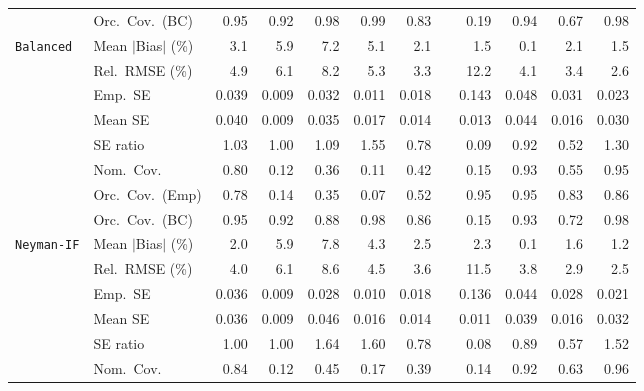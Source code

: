 \begin{landscape}
\begin{longtable}{llrrrrrrrrrr}
 & Orc.\ Cov.\ (BC) & \cellcolor{rankone}0.95 & 0.92 & 0.98 & 0.99 & 0.83 &  & 0.19 & \cellcolor{ranktwo}0.94 & 0.67 & \cellcolor{rankthree}0.98 \\
\addlinespace[2pt]
\quad \texttt{Balanced} & Mean $|$Bias$|$ (\%) & 3.1 & 5.9 & 7.2 & 5.1 & 2.1 &  & \cellcolor{rankthree}1.5 & \cellcolor{rankone}0.1 & 2.1 & \cellcolor{ranktwo}1.5 \\
 & Rel.\ RMSE (\%) & 4.9 & 6.1 & 8.2 & 5.3 & \cellcolor{ranktwo}3.3 &  & 12.2 & 4.1 & \cellcolor{rankthree}3.4 & \cellcolor{rankone}2.6 \\
 & Emp.\ SE & 0.039 & 0.009 & 0.032 & 0.011 & 0.018 &  & 0.143 & 0.048 & 0.031 & 0.023 \\
 & Mean SE & 0.040 & 0.009 & 0.035 & 0.017 & 0.014 &  & 0.013 & 0.044 & 0.016 & 0.030 \\
 & SE ratio & \cellcolor{ranktwo}1.03 & \cellcolor{rankone}1.00 & 1.09 & 1.55 & 0.78 &  & 0.09 & \cellcolor{rankthree}0.92 & 0.52 & 1.30 \\
 & Nom.\ Cov. & \cellcolor{rankthree}0.80 & 0.12 & 0.36 & 0.11 & 0.42 &  & 0.15 & \cellcolor{ranktwo}0.93 & 0.55 & \cellcolor{rankone}0.95 \\
 & Orc.\ Cov.\ (Emp) & 0.78 & 0.14 & 0.35 & 0.07 & 0.52 &  & \cellcolor{ranktwo}0.95 & \cellcolor{rankone}0.95 & 0.83 & \cellcolor{rankthree}0.86 \\
 & Orc.\ Cov.\ (BC) & \cellcolor{rankone}0.95 & 0.92 & 0.88 & \cellcolor{rankthree}0.98 & 0.86 &  & 0.15 & \cellcolor{ranktwo}0.93 & 0.72 & 0.98 \\
\addlinespace[2pt]
\quad \texttt{Neyman-IF} & Mean $|$Bias$|$ (\%) & 2.0 & 5.9 & 7.8 & 4.3 & 2.5 &  & 2.3 & \cellcolor{rankone}0.1 & \cellcolor{rankthree}1.6 & \cellcolor{ranktwo}1.2 \\
 & Rel.\ RMSE (\%) & 4.0 & 6.1 & 8.6 & 4.5 & \cellcolor{rankthree}3.6 &  & 11.5 & 3.8 & \cellcolor{ranktwo}2.9 & \cellcolor{rankone}2.5 \\
 & Emp.\ SE & 0.036 & 0.009 & 0.028 & 0.010 & 0.018 &  & 0.136 & 0.044 & 0.028 & 0.021 \\
 & Mean SE & 0.036 & 0.009 & 0.046 & 0.016 & 0.014 &  & 0.011 & 0.039 & 0.016 & 0.032 \\
 & SE ratio & \cellcolor{rankone}1.00 & \cellcolor{ranktwo}1.00 & 1.64 & 1.60 & 0.78 &  & 0.08 & \cellcolor{rankthree}0.89 & 0.57 & 1.52 \\
 & Nom.\ Cov. & \cellcolor{rankthree}0.84 & 0.12 & 0.45 & 0.17 & 0.39 &  & 0.14 & \cellcolor{ranktwo}0.92 & 0.63 & \cellcolor{rankone}0.96 \\

\end{longtable}
\end{landscape}
